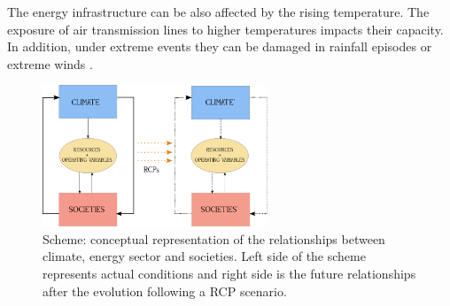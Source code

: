 The energy infrastructure can be also affected by the rising temperature. The exposure of air transmission lines to higher temperatures impacts their capacity. In addition, under extreme events they can be damaged in rainfall episodes or extreme winds \cite*{Troccoli2018}. 


\begin{figure}[h!]
\centering\includegraphics[width=0.6\textwidth]{figs/drawing.pdf}
\caption[Conceptual scheme: climate, energy and societies interactions]{Scheme: conceptual representation of the relationships between climate, energy sector and societies. Left side of the scheme represents actual conditions and right side is the future relationships after the evolution following a RCP scenario. }
\label{fig:feedback}
\end{figure}

 




